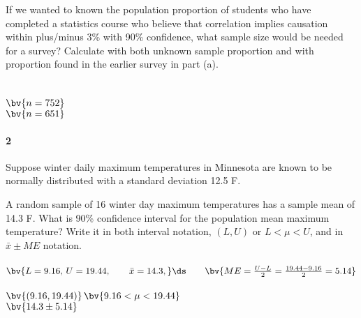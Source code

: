 \documentclass{article}
\begin{document}
\begin{flushleft}
\begin{enumalpha}
\vspace{.5in}
\item If we wanted to known the population proportion of students who have completed a statistics course who believe that correlation implies causation within plus/minus 3\% with 90\% confidence, what sample size would be needed for a survey? Calculate with both unknown sample proportion and with proportion found in the earlier survey in part (a).\\
\medskip
{}\\
\\
\smallskip
{}\qquad$\bv{n=752}$\\
\qquad$\bv{n=651}$
\end{enumalpha}



\newpage
\paragraph{2} Suppose winter daily maximum temperatures in Minnesota are known to be normally distributed with a standard deviation 12.5 \textdegree F. 
\begin{enumalpha}
\item A random sample of 16 winter day maximum temperatures has a sample mean of  14.3 \textdegree F. What is 90\% confidence interval for the population mean maximum temperature? Write it in both interval notation, $(L, U)$ or $L < \mu < U$, and in $\bar x \pm ME$ notation. \\
\medskip
{}\\
\medskip
$\bv{L = 9.16,\, U=19.44, \qquad \bar x = 14.3,}\ds\qquad \bv{ME = \frac{U - L}{2} = \frac{19.44 - 9.16}{2} = 5.14}$\\
\bigskip
{}\\$\bv{(9.16, 19.44)}$$\bv{9.16 < \mu < 19.44}$\\$\bv{14.3 \pm 5.14}$\\

\vspace{.5in}


\end{enumalpha}
\end{flushleft}
\end{document}
